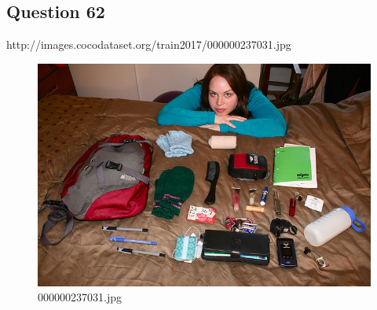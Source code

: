 \subsection*{Question 62}
http://images.cocodataset.org/train2017/000000237031.jpg
\begin{figure}[h]
    \centering
    \includegraphics[width=0.8\linewidth]{../image set/hard/000000237031.jpg}
    \caption{000000237031.jpg}
\end{figure}
